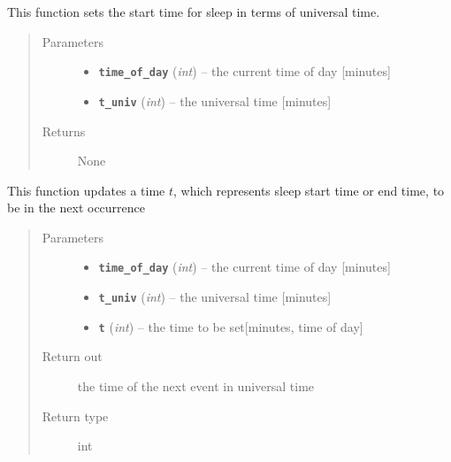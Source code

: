 \documentclass[letterpaper,10pt,english]{sphinxmanual}
\begin{document}
\begin{fulllineitems}
\begin{fulllineitems}
\label{bio:bio.Bio.update_sleep_start_univ}
This function sets the start time for sleep in terms of universal time.
\begin{quote}\begin{description}
\item[{Parameters}] \leavevmode\begin{itemize}
\item {} 
\textbf{\texttt{time\_of\_day}} (\emph{int}) -- the current time of day {[}minutes{]}

\item {} 
\textbf{\texttt{t\_univ}} (\emph{int}) -- the universal time {[}minutes{]}

\end{itemize}

\item[{Returns}] \leavevmode
None

\end{description}\end{quote}

\end{fulllineitems}


\begin{fulllineitems}
\label{bio:bio.Bio.update_time_univ}
This function updates a time \(t\), which represents sleep start time or end time, to be in the         next occurrence
\begin{quote}\begin{description}
\item[{Parameters}] \leavevmode\begin{itemize}
\item {} 
\textbf{\texttt{time\_of\_day}} (\emph{int}) -- the current time of day {[}minutes{]}

\item {} 
\textbf{\texttt{t\_univ}} (\emph{int}) -- the universal time {[}minutes{]}

\item {} 
\textbf{\texttt{t}} (\emph{int}) -- the time to be set{[}minutes, time of day{]}

\end{itemize}

\item[{Return out}] \leavevmode
the time of the next event in universal time

\item[{Return type}] \leavevmode
int

\end{description}\end{quote}

\end{fulllineitems}


\end{fulllineitems}
\end{document}
